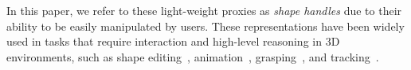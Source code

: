 In this paper, we refer to these light-weight proxies as \emph{shape handles} due to their ability to be easily manipulated by users.
These representations have been widely used in tasks that require interaction and high-level
reasoning in 3D environments, such as shape editing~\cite{gsmc_iwires_sig_09, spheremesh}, 
animation~\cite{animatedsm}, grasping~\cite{graspplaning}, and tracking~\cite{smhandtrack}.



